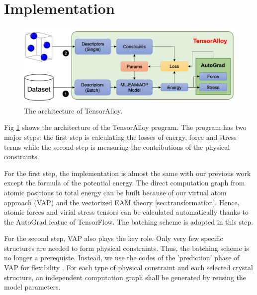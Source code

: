 \documentclass[prb,reprint,superscriptaddress]{revtex4-2}
\begin{document}
% 
%
\section{Implementation}
\label{sec:implementation}

% 
%
\begin{figure}
\centering
\includegraphics[scale=0.45]{tensoralloy.png}
\caption{\label{fig:tensoralloy} The architecture of TensorAlloy.}
\end{figure}

Fig \ref{fig:tensoralloy} shows the architecture of the TensorAlloy program. The 
program has two major steps: the first step is calculating the losses of energy,
force and stress terms while the second step is measuring the contributions of 
the physical constraints. 

For the first step, the implementation is almost the same with our previous 
work \cite{TensorAlloy} except the formula of the potential energy. The direct
computation graph from atomic positions to total energy can be built because of
our virtual atom approach (VAP) \cite{TensorAlloy} and the vectorized EAM theory
\ref{sec:transformation}. Hence, atomic forces and virial stress tensors can be 
calculated automatically thanks to the AutoGrad featue of TensorFlow. The 
batching scheme is adopted in this step.

For the second step, VAP also plays the key role. Only very few specific 
structures are needed to form physical constraints. Thus, the batching scheme is 
no longer a prerequiste. Instead, we use the codes of the 'prediction' phase of 
VAP for flexibility \cite{TensorAlloy}. For each type of physical constraint and 
each selected crystal structure, an independent computation graph shall be 
generated by reusing the model parameters. 
 
\end{document}
